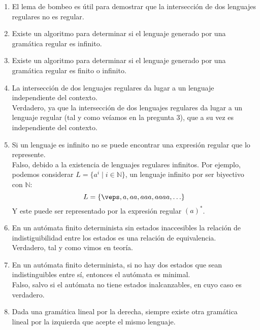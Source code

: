 \begin{enumerate}
    \item El lema de bombeo es útil para demostrar que la intersección de dos lenguajes regulares no es regular.\\

    \item Existe un algoritmo para determinar si el lenguaje generado por una gramática regular es infinito.\\

    \item Existe un algoritmo para determinar si el lenguaje generado por una gramática regular es finito o infinito.\\

    \item La intersección de dos lenguajes regulares da lugar a un lenguaje independiente del contexto.\\

        Verdadero, ya que la intersección de dos lenguajes regulares da lugar a un lenguaje regular (tal y como veíamos en la pregunta 3), que a su vez es independiente del contexto.
    \item Si un lenguaje es infinito no se puede encontrar una expresión regular que lo represente.\\

        Falso, debido a la existencia de lenguajes regulares infinitos. Por ejemplo, podemos considerar $L = \{a^i \mid i \in \mathbb{N}\}$, un lenguaje infinito por ser biyectivo con $\mathbb{N}$:
        \begin{equation*}
            L = \{\veps, a, aa, aaa, aaaa, \ldots\}
        \end{equation*}
        Y este puede ser representado por la expresión regular ${(a)}^{\ast}$.
    \item En un autómata finito determinista sin estados inaccesibles la relación de indistiguibilidad entre los estados es una relación de equivalencia.\\

        Verdadero, tal y como vimos en teoría.
    \item En un autómata finito determinista, si no hay dos estados que sean indistinguibles entre sí, entonces el autómata es minimal.\\

        Falso, salvo si el autómata no tiene estados inalcanzables, en cuyo caso es verdadero.
    \item Dada una gramática lineal por la derecha, siempre existe otra gramática lineal por la izquierda que acepte el mismo lenguaje.\\


\end{enumerate}
